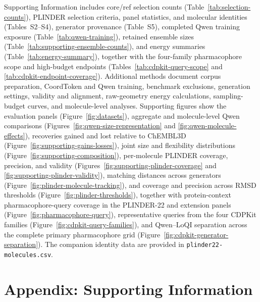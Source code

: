\documentclass[letterpaper]{article}
\begin{document}
Supporting Information includes core/ref selection counts (Table~\ref{tab:selection-counts}),
PLINDER selection criteria, panel statistics, and molecular identities (Tables~S2--S4),
generator provenance (Table~S5), completed Qwen training exposure
(Table~\ref{tab:qwen-training}), retained ensemble sizes
(Table~\ref{tab:supporting-ensemble-counts}), and energy summaries
(Table~\ref{tab:energy-summary}), together with the four-family pharmacophore
scope and high-budget endpoints (Tables~\ref{tab:cdpkit-query-scope} and
\ref{tab:cdpkit-endpoint-coverage}). Additional methods
document corpus preparation, CoordToken and Qwen training, benchmark exclusions,
generation settings, validity and alignment, raw-geometry energy calculations,
sampling-budget curves, and molecule-level analyses. Supporting figures show the
evaluation panels (Figure~\ref{fig:datasets}), aggregate and molecule-level Qwen comparisons
(Figures~\ref{fig:qwen-size-representation} and \ref{fig:qwen-molecule-effects}), recoveries gained and
lost relative to ChEMBL3D (Figure~\ref{fig:supporting-gains-losses}), joint size and flexibility distributions
(Figure~\ref{fig:supporting-composition}), per-molecule PLINDER coverage, precision, and validity
(Figures~\ref{fig:supporting-plinder-coverage} and \ref{fig:supporting-plinder-validity}), matching
distances across generators (Figure~\ref{fig:plinder-molecule-tracking}), and coverage and precision
across RMSD thresholds (Figure~\ref{fig:plinder-thresholds}), together with protein-context
pharmacophore-query coverage in the PLINDER-22 and extension panels
(Figure~\ref{fig:pharmacophore-query}), representative queries from the four CDPKit
families (Figure~\ref{fig:cdpkit-query-families}), and Qwen--LoQI separation across
the complete primary pharmacophore grid
(Figure~\ref{fig:cdpkit-generator-separation}).
The companion identity data are provided in \texttt{plinder22-molecules.csv}.

\printbibliography
%

\clearpage
\begingroup
\setcounter{table}{0}
\setcounter{figure}{0}
\renewcommand{\thetable}{S\arabic{table}}
\renewcommand{\thefigure}{S\arabic{figure}}
\ifdefined\theHtable{}\fi
\ifdefined\theHfigure{}\fi
\section*{Appendix: Supporting Information}

\clearpage
\endgroup
\end{document}
